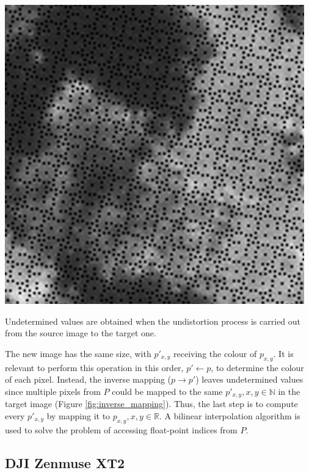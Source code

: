 \begin{marginfigure}[-1.5cm]
	\includegraphics{figs/materials/inverse_mapping.png}
	\caption{Undetermined values are obtained when the undistortion process is carried out from the source image to the target one.}
	\label{fig:inverse_mapping}
\end{marginfigure}
The new image has the same size, with $p'_{x,y}$ receiving the colour of $p_{x,y}$. It is relevant to perform this operation in this order, $p' \gets p$, to determine the colour of each pixel. Instead, the inverse mapping ($p \rightarrow p'$) leaves undetermined values since multiple pixels from $P$ could be mapped to the same $p'_{x, y}, x, y \in \mathbb{N}$ in the target image (Figure \ref{fig:inverse_mapping}). Thus, the last step is to compute every $p'_{x,y}$ by mapping it to $p_{x, y}, x, y \in \mathbb{R}$. A bilinear interpolation algorithm is used to solve the problem of accessing float-point indices from $P$.

\subsection{DJI Zenmuse XT2}

